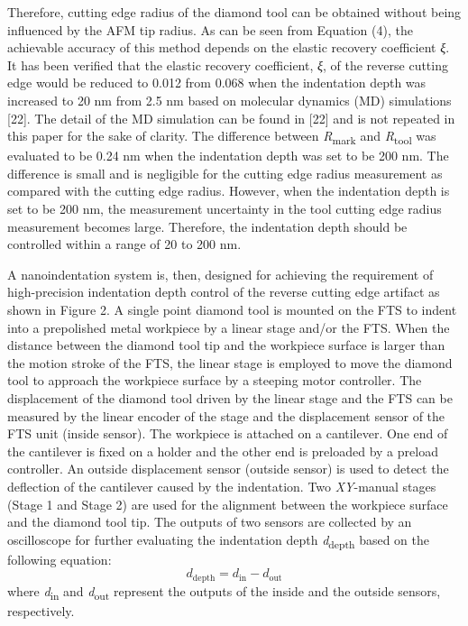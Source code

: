 \documentclass{article}
\newcommand{\R}[1]{\emph{R}\textsubscript{#1}}
\begin{document}
Therefore, cutting edge radius of the diamond tool can be obtained without being influenced by the AFM tip radius. As can be seen from Equation (4), the achievable accuracy of this method depends on the elastic recovery coefficient \emph{ξ}. It has been verified that the elastic recovery coefficient, \emph{ξ}, of the reverse cutting edge would be reduced to 0.012 from 0.068 when the indentation depth was increased to 20 nm from 2.5 nm based on molecular dynamics (MD) simulations [22]. The detail of the MD simulation can be found in [22] and is not repeated in this paper for the sake of clarity. The difference between \R{mark} and \R{tool} was evaluated to be 0.24 nm when the indentation depth was set to be 200 nm. The difference is small and is negligible for the cutting edge radius measurement as compared with the cutting edge radius. However, when the indentation depth is set to be 200 nm, the measurement uncertainty in the tool cutting edge radius measurement becomes large. Therefore, the indentation depth should be controlled within a range of 20 to 200 nm.

A nanoindentation system is, then, designed for achieving the requirement of high-precision indentation depth control of the reverse cutting edge artifact as shown in Figure 2. A single point diamond tool is mounted on the FTS to indent into a prepolished metal workpiece by a linear stage and/or the FTS. When the distance between the diamond tool tip and the workpiece surface is larger than the motion stroke of the FTS, the linear stage is employed to move the diamond tool to approach the workpiece surface by a steeping motor controller. The displacement of the diamond tool driven by the linear stage and the FTS can be measured by the linear encoder of the stage and the displacement sensor of the FTS unit (inside sensor). The workpiece is attached on a cantilever. One end of the cantilever is fixed on a holder and the other end is preloaded by a preload controller. An outside displacement sensor (outside sensor) is used to detect the deflection of the cantilever caused by the indentation. Two \emph{XY}-manual stages (Stage 1 and Stage 2) are used for the alignment between the workpiece surface and the diamond tool tip. The outputs of two sensors are collected by an oscilloscope for further evaluating the indentation depth \emph{d}\textsubscript{depth} based on the following equation:
\begin{equation}
d_\mathrm{depth} = d_\mathrm{in} - d_\mathrm{out}
\tag{5}
\end{equation}
where \emph{d}\textsubscript{in} and \emph{d}\textsubscript{out} represent the outputs of the inside and the outside sensors, respectively.
\end{document}
